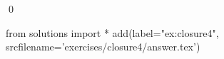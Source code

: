 
\begin{ex} 
  \label{ex:closure4}
  
  \qed
\end{ex} 
\begin{python0}
from solutions import *
add(label="ex:closure4",
    srcfilename='exercises/closure4/answer.tex') 
\end{python0}
